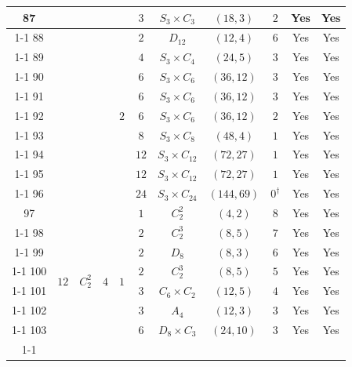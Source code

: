 \documentclass[12pt]{amsart}
\numberwithin{equation}{section}
\theoremstyle{plain}
\theoremstyle{definition}
\theoremstyle{remark}
\begin{document}
{\begin{longtable}{|c|c|c|c|c|c|c|c|c|c|c|}
87 &  &  &  &  & $3$ & \multicolumn{1}{c|}{$S_3\times C_3$} & $(18,3)$ & $2$ & Yes & Yes \\ \cline{1-1} \cline{5-11}
88 &  &  &  & \multirow[t]{9}{*}{$2$} & $2$ & \multicolumn{1}{c|}{$D_{12}$} & $(12,4)$ & $6$ & Yes & Yes \\ \cline{1-1} \cline{6-11}
89 &  &  &  &  & $4$ & \multicolumn{1}{c|}{$S_3\times C_4$} & $(24,5)$ & $3$ & Yes & Yes \\ \cline{1-1} \cline{6-11}
90 &  &  &  &  & $6$ & \multicolumn{1}{c|}{$S_3\times C_6$} & $(36,12)$ & $3$ & Yes & Yes \\ \cline{1-1} \cline{6-11}
91 &  &  &  &  & $6$ & \multicolumn{1}{c|}{$S_3\times C_6$} & $(36,12)$ & $3$ & Yes & Yes \\ \cline{1-1} \cline{6-11}
92 &  &  &  &  & $6$ & \multicolumn{1}{c|}{$S_3\times C_6$} & $(36,12)$ & $2$ & Yes & Yes \\ \cline{1-1} \cline{6-11}
93 &  &  &  &  & $8$ & \multicolumn{1}{c|}{$S_3\times C_8$} & $(48,4)$ & $1$ & Yes & Yes \\ \cline{1-1} \cline{6-11}
94 &  &  &  &  & $12$ & \multicolumn{1}{c|}{$S_3\times C_{12}$} & $(72,27)$ & $1$ & Yes & Yes \\ \cline{1-1} \cline{6-11}
95 &  &  &  &  & $12$ & \multicolumn{1}{c|}{$S_3\times C_{12}$} & $(72,27)$ & $1$ & Yes & Yes \\ \cline{1-1} \cline{6-11}
96 &  &  &  &  & $24$ & \multicolumn{1}{c|}{$S_3\times C_{24}$} & $(144,69)$ & $0^\dagger$ & Yes & Yes \\ \hline
97 & \multirow[t]{22}{*}{$12$} & \multirow[t]{9}{*}{$C_2^2$} & \multirow[t]{9}{*}{$4$} & \multirow[t]{9}{*}{$1$} & $1$ & \multicolumn{1}{c|}{$C_2^2$} & $(4,2)$ & $8$ & Yes & Yes \\ \cline{1-1} \cline{6-11}
98 &  &  &  &  & $2$ & \multicolumn{1}{c|}{$C_2^3$} & $(8,5)$ & $7$ & Yes & Yes \\ \cline{1-1} \cline{6-11}
99 &  &  &  &  & $2$ & \multicolumn{1}{c|}{$D_8$} & $(8,3)$ & $6$ & Yes & Yes \\ \cline{1-1} \cline{6-11}
100 &  &  &  &  & $2$ & \multicolumn{1}{c|}{$C_2^3$} & $(8,5)$ & $5$ & Yes & Yes \\ \cline{1-1} \cline{6-11}
101 &  &  &  &  & $3$ & \multicolumn{1}{c|}{$C_{6} \times C_{2}$} & $(12,5)$ & $4$ & Yes & Yes \\ \cline{1-1} \cline{6-11}
102 &  &  &  &  & $3$ & \multicolumn{1}{c|}{$A_4$} & $(12,3)$ & $3$ & Yes & Yes \\ \cline{1-1} \cline{6-11}
103 &  &  &  &  & $6$ & \multicolumn{1}{c|}{$D_8\times C_3$} & $(24,10)$ & $3$ & Yes & Yes \\ \cline{1-1} \cline{6-11}

\end{longtable}}
\end{document}
